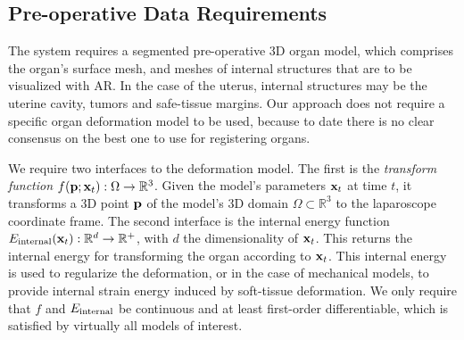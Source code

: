 \subsection{Pre-operative Data Requirements}
\label{sec:inputModels}
The system requires a segmented pre-operative 3D organ model, which comprises the organ's surface mesh, and meshes of internal structures that are to be visualized with AR.
In the case of the uterus, internal structures may be the uterine cavity, tumors and safe-tissue margins. %
Our approach does not require a specific organ deformation model to be used, because to date there is no clear consensus on the best one to use for registering organs. %

We require two interfaces to the deformation model. 
The first is the \emph{transform function} $f(\mathbf{p};\mathbf{x}_t): \Omega\rightarrow \mathbb{R}^3$.
Given the model's parameters $\mathbf{x}_t$ at time $t$, it transforms a 3D point $\mathbf{p}$ of the model's 3D domain $\Omega\subset \mathbb{R}^3$ to the laparoscope coordinate frame. 
The second interface is the internal energy function $E_{\text{internal}}(\mathbf{x}_{t}):\mathbb{R}^{d}\rightarrow\mathbb{R}^{+}$, with $d$ the dimensionality of $\mathbf{x}_{t}$. This returns the internal energy for transforming the organ according to  $\mathbf{x}_t$.
This internal energy is used to regularize the deformation, or in the case of mechanical models, to provide internal strain energy induced by soft-tissue deformation.
We only require that $f$ and $E_{\text{internal}}$ be continuous and at least first-order differentiable, which is satisfied by virtually all models of interest.
 
